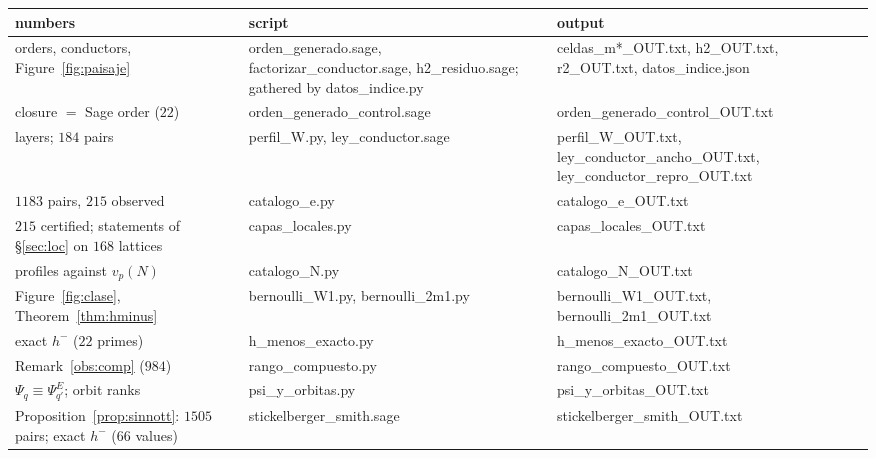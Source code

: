 \documentclass[11pt,a4paper]{article}
\theoremstyle{definition}
\begin{document}
\begin{center}\footnotesize
{}
\begin{tabular}{p{}p{}p{}}
\toprule
numbers & script & output \\
\midrule
orders, conductors, Figure~\ref{fig:paisaje} & {\ttfamily\footnotesize orden\_generado.sage, factorizar\_conductor.sage, h2\_residuo.sage; gathered by datos\_indice.py} & {\ttfamily\footnotesize celdas\_m*\_OUT.txt, \allowbreak h2\_OUT.txt, \allowbreak r2\_OUT.txt, \allowbreak datos\_indice.json} \\
closure $=$ Sage order ($22$) & {\ttfamily\footnotesize orden\_generado\_control.sage} & {\ttfamily\footnotesize orden\_generado\_control\_OUT.txt} \\
layers; $184$ pairs & {\ttfamily\footnotesize perfil\_W.py, ley\_conductor.sage} & {\ttfamily\footnotesize perfil\_W\_OUT.txt, \allowbreak ley\_conductor\_ancho\_OUT.txt, \allowbreak ley\_conductor\_repro\_OUT.txt} \\
$1183$ pairs, $215$ observed & {\ttfamily\footnotesize catalogo\_e.py} & {\ttfamily\footnotesize catalogo\_e\_OUT.txt} \\
$215$ certified; statements of \S\ref{sec:loc} on $168$ lattices & {\ttfamily\footnotesize capas\_locales.py} & {\ttfamily\footnotesize capas\_locales\_OUT.txt} \\
profiles against $v_p(N)$ & {\ttfamily\footnotesize catalogo\_N.py} & {\ttfamily\footnotesize catalogo\_N\_OUT.txt} \\
Figure~\ref{fig:clase}, Theorem~\ref{thm:hminus} & {\ttfamily\footnotesize bernoulli\_W1.py, bernoulli\_2m1.py} & {\ttfamily\footnotesize bernoulli\_W1\_OUT.txt, \allowbreak bernoulli\_2m1\_OUT.txt} \\
exact $h^-$ ($22$ primes) & {\ttfamily\footnotesize h\_menos\_exacto.py} & {\ttfamily\footnotesize h\_menos\_exacto\_OUT.txt} \\
Remark~\ref{obs:comp} ($984$) & {\ttfamily\footnotesize rango\_compuesto.py} & {\ttfamily\footnotesize rango\_compuesto\_OUT.txt} \\
$\Psi_q\equiv\Psi_{q'}^E$; orbit ranks & {\ttfamily\footnotesize psi\_y\_orbitas.py} & {\ttfamily\footnotesize psi\_y\_orbitas\_OUT.txt} \\
Proposition~\ref{prop:sinnott}: $1505$ pairs; exact $h^-$ ($66$ values) & {\ttfamily\footnotesize stickelberger\_smith.sage} & {\ttfamily\footnotesize stickelberger\_smith\_OUT.txt} \\

\end{tabular}
\end{center}
\end{document}
